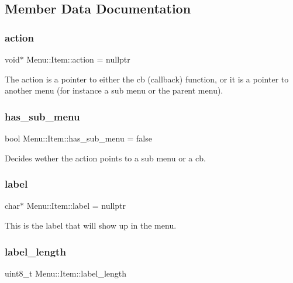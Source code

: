 \subsection{Member Data Documentation}
\hypertarget{struct_menu_1_1_item_a247e140fed2addf80986ba5a3506b9dd}{}\label{struct_menu_1_1_item_a247e140fed2addf80986ba5a3506b9dd} 
\subsubsection{\texorpdfstring{action}{action}}
{\footnotesize\ttfamily void$\ast$ Menu\+::\+Item\+::action = nullptr}

The action is a pointer to either the cb (callback) function, or it is a pointer to another menu (for instance a sub menu or the parent menu). \hypertarget{struct_menu_1_1_item_a5c9895a137458b9a12dafd447ac7430b}{}\label{struct_menu_1_1_item_a5c9895a137458b9a12dafd447ac7430b} 
\subsubsection{\texorpdfstring{has\+\_\+sub\+\_\+menu}{has\_sub\_menu}}
{\footnotesize\ttfamily bool Menu\+::\+Item\+::has\+\_\+sub\+\_\+menu = false}

Decides wether the action points to a sub menu or a cb. \hypertarget{struct_menu_1_1_item_a378723382fc64c752a85ffe6fec9707e}{}\label{struct_menu_1_1_item_a378723382fc64c752a85ffe6fec9707e} 
\subsubsection{\texorpdfstring{label}{label}}
{\footnotesize\ttfamily char$\ast$ Menu\+::\+Item\+::label = nullptr}

This is the label that will show up in the menu. \hypertarget{struct_menu_1_1_item_a46749d046bbbde8d5308848d5394c2dc}{}\label{struct_menu_1_1_item_a46749d046bbbde8d5308848d5394c2dc} 
\subsubsection{\texorpdfstring{label\+\_\+length}{label\_length}}
{\footnotesize\ttfamily uint8\+\_\+t Menu\+::\+Item\+::label\+\_\+length}

